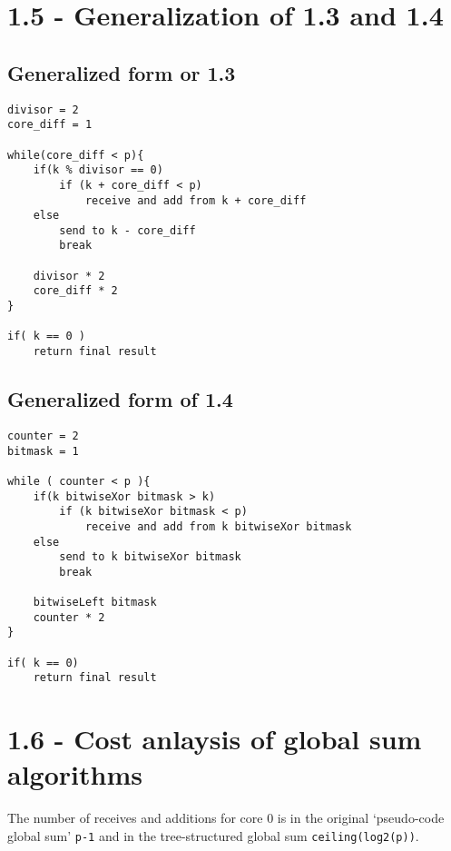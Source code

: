 \documentclass[a4paper,11pt,twoside]{article}
\begin{document}
\section{1.5 - Generalization of 1.3 and 1.4}

\subsection{Generalized form or 1.3}
\begin{verbatim}
divisor = 2
core_diff = 1

while(core_diff < p){
    if(k % divisor == 0)
        if (k + core_diff < p)  
            receive and add from k + core_diff
    else 
        send to k - core_diff
        break

    divisor * 2
    core_diff * 2
}

if( k == 0 )
    return final result
\end{verbatim}

\subsection{Generalized form of 1.4} 
\begin{verbatim}
counter = 2
bitmask = 1

while ( counter < p ){
    if(k bitwiseXor bitmask > k)
        if (k bitwiseXor bitmask < p)
            receive and add from k bitwiseXor bitmask
    else
        send to k bitwiseXor bitmask
        break

    bitwiseLeft bitmask
    counter * 2
}

if( k == 0)
    return final result
\end{verbatim}

\section{1.6 - Cost anlaysis of global sum algorithms}
The number of receives and additions for core 0 is in the original `pseudo-code global sum' \verb+p-1+ and in the tree-structured global sum \verb+ceiling(log2(p))+.


\end{document}
